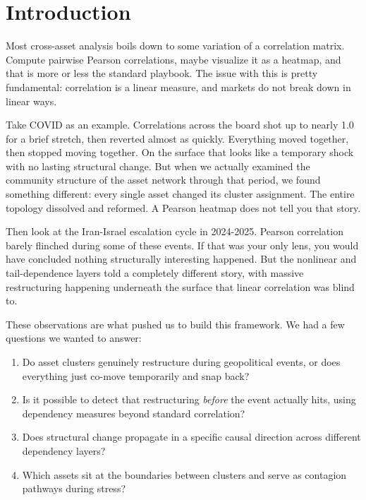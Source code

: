 \documentclass[12pt, letterpaper]{article}
\begin{document}
\newpage
\tableofcontents
\newpage

\section{Introduction}

Most cross-asset analysis boils down to some variation of a correlation matrix. Compute pairwise Pearson correlations, maybe visualize it as a heatmap, and that is more or less the standard playbook. The issue with this is pretty fundamental: correlation is a linear measure, and markets do not break down in linear ways.

Take COVID as an example. Correlations across the board shot up to nearly 1.0 for a brief stretch, then reverted almost as quickly. Everything moved together, then stopped moving together. On the surface that looks like a temporary shock with no lasting structural change. But when we actually examined the community structure of the asset network through that period, we found something different: every single asset changed its cluster assignment. The entire topology dissolved and reformed. A Pearson heatmap does not tell you that story.

Then look at the Iran-Israel escalation cycle in 2024-2025. Pearson correlation barely flinched during some of these events. If that was your only lens, you would have concluded nothing structurally interesting happened. But the nonlinear and tail-dependence layers told a completely different story, with massive restructuring happening underneath the surface that linear correlation was blind to.

These observations are what pushed us to build this framework. We had a few questions we wanted to answer:

\begin{enumerate}[label=\arabic*.]
    \item Do asset clusters genuinely restructure during geopolitical events, or does everything just co-move temporarily and snap back?
    \item Is it possible to detect that restructuring \textit{before} the event actually hits, using dependency measures beyond standard correlation?
    \item Does structural change propagate in a specific causal direction across different dependency layers?
    \item Which assets sit at the boundaries between clusters and serve as contagion pathways during stress?
\end{enumerate}
\end{document}
